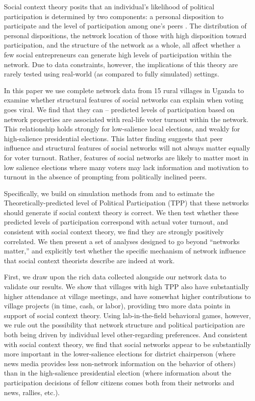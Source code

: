 \documentclass[12pt]{article}
\begin{document}
Social context theory posits that an individual's likelihood of political participation is determined by two components: a personal disposition to participate and the level of participation among one's peers \citep{Fowler:2005ts,Siegel:2009vi,Rolfe:2012ka}. The distribution of personal dispositions, the network location of those with high disposition toward participation, and the structure of the network as a whole, all affect whether a few social entrepreneurs can generate high levels of participation within the network.  Due to data constraints, however, the implications of this theory are rarely tested using real-world (as compared to fully simulated) settings.

In this paper we use complete network data from 15 rural villages in Uganda to examine whether structural features of social networks can explain when voting goes viral.  We find that they can --  predicted levels of participation based on network properties are associated with real-life voter turnout within the network. This relationship holds strongly for low-salience local elections, and weakly for high-salience presidential elections. This latter finding suggests that peer influence and structural features of social networks will not always matter equally for voter turnout. Rather, features of social networks are likely to matter most in low salience elections where many voters may lack information and motivation to turnout in the absence of prompting from politically inclined peers.

Specifically, we build on simulation methods from \cite{Siegel:2009vi} and \cite{Rolfe:2012ka} to estimate the Theoretically-predicted level of Political Participation (TPP) that these networks should generate if social context theory is correct. We then test whether these predicted levels of participation correspond with actual voter turnout, %
and consistent with social context theory, we find they are strongly positively correlated. We then present a set of analyses designed to go beyond ``networks matter,'' and explicitly test whether the specific mechanism of network influence that social context theorists describe are indeed at work.

First, we draw upon the rich data collected alongside our network data to validate our results. We show that villages with high TPP also have substantially higher attendance at village meetings, and have somewhat higher contributions to village projects (in time, cash, or labor), providing two more data points in support of social context theory. Using lab-in-the-field behavioral games, however, we rule out the possibility that network structure and political participation are both being driven by individual level other-regarding preferences. And consistent with social context theory, we find that social networks appear to be substantially more important in the lower-salience elections for district chairperson (where news media provides less non-network information on the behavior of others) than in the high-salience presidential election (where information about the participation decisions of fellow citizens comes both from their networks and news, rallies, etc.).
\end{document}
